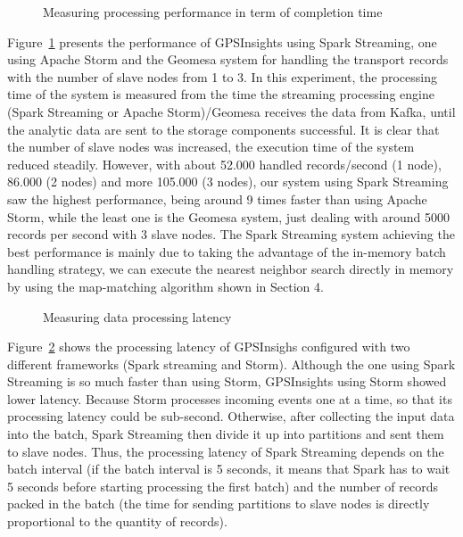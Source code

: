 \documentclass{sig-alternate-05-2015}
\begin{document}
	
	\begin{figure}[h]
		\centering
		\caption{Measuring processing performance in term of completion time}
		\label{fig:performance}
	\end{figure}

Figure~\ref{fig:performance} presents the performance of GPSInsights using Spark Streaming, one using Apache Storm and the Geomesa system for handling the transport records with the number of slave nodes from 1 to 3. In this experiment, the processing time of the system is measured from the time the streaming processing engine (Spark Streaming or Apache Storm)/Geomesa receives the data from Kafka, until the analytic data are sent to the storage components successful. It is clear that the number of slave nodes was increased, the execution time of the system reduced steadily. However, with about 52.000 handled records/second (1 node), 86.000 (2 nodes) and more 105.000 (3 nodes), our system using Spark Streaming saw the highest performance, being around 9 times faster than using Apache Storm, while the least one is the Geomesa system, just dealing with around 5000 records per second with 3 slave nodes. The Spark Streaming system achieving the best performance is mainly due to taking the advantage of the in-memory batch handling strategy, we can execute the nearest neighbor search directly in memory by using the map-matching algorithm shown in Section 4.

	\begin{figure}[h]
		\centering
		\caption{Measuring data processing latency}
		\label{fig:timedelay}
	\end{figure}
	
Figure~\ref{fig:timedelay} shows the processing latency of GPSInsighs configured with two different frameworks (Spark streaming and Storm). Although the one using Spark Streaming is so much faster than using Storm, GPSInsights using Storm showed lower latency. Because Storm processes incoming events one at a time, so that its processing latency could be sub-second. Otherwise, after collecting the input data into the batch, Spark Streaming then divide it up into partitions and sent them to slave nodes. Thus, the processing latency of Spark Streaming depends on the batch interval (if the batch interval is 5 seconds, it means that Spark has to wait 5 seconds before starting processing the first batch) and the number of records packed in the batch (the time for sending partitions to slave nodes is directly proportional to the quantity of records).
\end{document}

